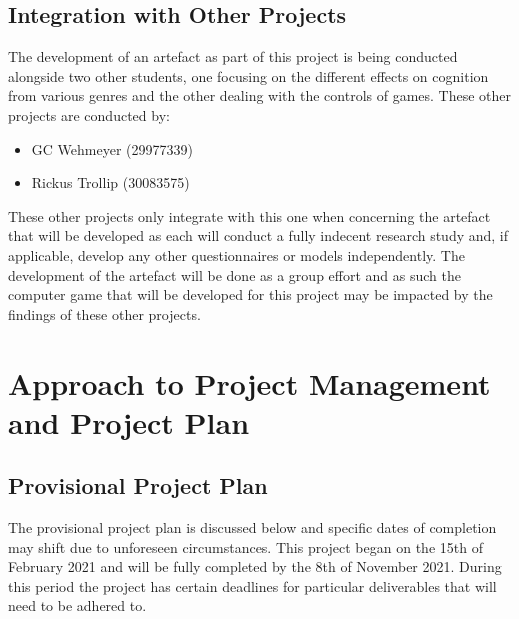 \subsection{Integration with Other Projects}
The development of an artefact as part of this project is being conducted alongside two other students, one focusing on the different effects on cognition from various genres and the other dealing with the controls of games. These other projects are conducted by:
\begin{itemize}
\item GC Wehmeyer (29977339)
\item Rickus Trollip (30083575)
\end{itemize}
These other projects only integrate with this one when concerning the artefact that will be developed as each will conduct a fully indecent research study and, if applicable, develop any other questionnaires or models independently. The development of the artefact will be done as a group effort and as such the computer game that will be developed for this project may be impacted by the findings of these other projects.

\section{Approach to Project Management and Project Plan}
\subsection{Provisional Project Plan}
The provisional project plan is discussed below and specific dates of completion may shift due to unforeseen circumstances. This project began on the 15th of February 2021 and will be fully completed by the 8th of November 2021. During this period the project has certain deadlines for particular deliverables that will need to be adhered to. 

